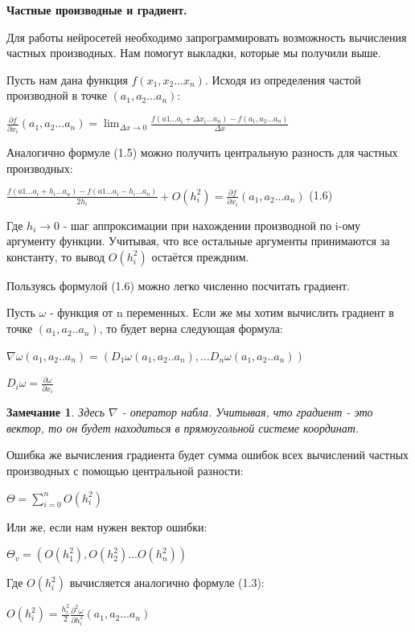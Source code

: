 \documentclass[12pt]{extarticle}
\newtheorem*{remark}{Замечание}
\begin{document}
	\centerline{\textbf{Частные производные и градиент.}}
	Для работы нейросетей необходимо запрограммировать возможность вычисления частных производных. Нам помогут выкладки, которые мы получили выше. 
	
	Пусть нам дана функция $f(x_1, x_2 \dots x_n)$. Исходя из определения частой производной в точке $(a_1, a_2 \dots a_n)$:
	
	\centerline{$ \frac{\partial f}{\partial x_i}(a_1, a_2 \dots a_n) = \displaystyle\lim_{\Delta x \rightarrow 0}\frac{f(a1 \dots a_i + \Delta x_i \dots a_n) - f(a_1, a_2 \dots a_n) } {\Delta x} $}
	
	Аналогично формуле (1.5) можно получить центральную разность для частных производных:
	
	\centerline{$\frac{f(a1 \dots a_i + h_i \dots a_n) - f(a1 \dots a_i - h_i \dots a_n)}{2h_i} + O(h_i^2) = \frac{\partial f}{\partial x_i}(a_1, a_2 \dots a_n)$ (1.6)}  
	
	Где $h_i \rightarrow 0$ - шаг аппроксимации при нахождении производной по i-ому аргументу функции. Учитывая, что все остальные аргументы принимаются за константу, то вывод $O(h_i^2)$ остаётся преждним. 
	
	Пользуясь формулой (1.6) можно легко численно посчитать градиент. 
	
	Пусть $\omega$ - функция от n переменных. Если же мы хотим вычислить градиент в точке $(a_1, a_2 .. a_n)$, то будет верна следующая формула:
	
	\centerline{$\nabla \omega(a_1, a_2 .. a_n) = (D_1\omega(a_1, a_2 .. a_n), \dots D_n\omega(a_1, a_2 .. a_n))$}
	\centerline{$D_i \omega = \frac{\partial \omega}{\partial x_i}$}
	
	\begin{remark}
		Здесь $\nabla$ - оператор набла. Учитывая, что градиент - это вектор, то он будет находиться в прямоугольной системе координат.
	\end{remark}
	
	\newpage
	Ошибка же вычисления градиента будет сумма ошибок всех вычислений частных производных с помощью центральной разности:
		
		\centerline{$\Theta = \displaystyle\sum_{i=0}^{n} O(h_i^2)$}
	
	Или же, если нам нужен вектор ошибки:
	
		\centerline{$\Theta_v = (O(h_1^2), O(h_2^2)... O(h_n^2))$}
		
	Где $O(h_i^2)$ вычисляется аналогично формуле (1.3):
	
		\centerline{$O(h_i^2) = \frac{h_i^2}{2} \frac{\partial^2 \omega}{\partial h_i^2}(a_1, a_2... a_n)$}
		
\end{document}
